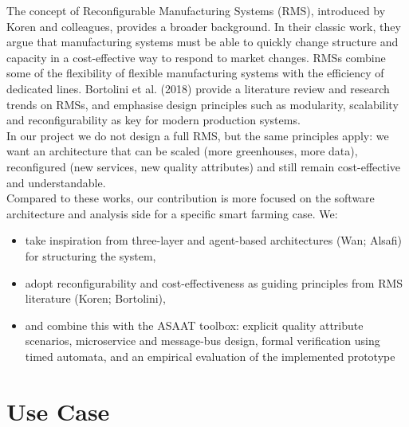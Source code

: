 \documentclass[conference]{IEEEtran}
\begin{document}
The concept of Reconfigurable Manufacturing Systems (RMS), introduced by Koren and colleagues, provides a broader background. In their classic work, they argue that manufacturing systems must be able to quickly change structure and capacity in a cost-effective way to respond to market changes.  RMSs combine some of the flexibility of flexible manufacturing systems with the efficiency of dedicated lines. Bortolini et al. (2018) provide a literature review and research trends on RMSs, and emphasise design principles such as modularity, scalability and reconfigurability as key for modern production systems. \\


In our project we do not design a full RMS, but the same principles apply: we want an architecture that can be scaled (more greenhouses, more data), reconfigured (new services, new quality attributes) and still remain cost-effective and understandable.\\

Compared to these works, our contribution is more focused on the software architecture and analysis side for a specific smart farming case. We:

\begin{itemize}
    \item take inspiration from three-layer and agent-based architectures (Wan; Alsafi) for structuring the system,
    \item adopt reconfigurability and cost-effectiveness as guiding principles from RMS literature (Koren; Bortolini),
    \item and combine this with the ASAAT toolbox: explicit quality attribute scenarios, microservice and message-bus design, formal verification using timed automata, and an empirical evaluation of the implemented prototype
\end{itemize}



\section{Use Case}
\label{sec:use_case}
\FloatBarrier
\end{document}
